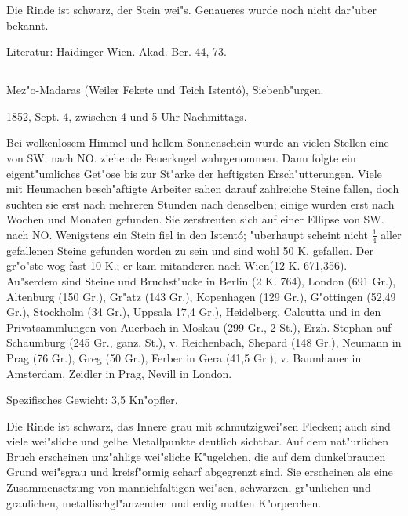 \documentclass[a4paper, 11pt, oneside]{article}
\begin{document}
Die Rinde ist schwarz, der Stein wei"s. Genaueres wurde noch nicht dar"uber bekannt.

\normalsize
Literatur: Haidinger Wien. Akad. Ber. 44, 73.

\subsection{}
\LARGE
\paragraph{}
Mez"o-Madaras (Weiler Fekete und Teich Istentó), Siebenb"urgen.

1852, Sept. 4, zwischen 4 und 5 Uhr Nachmittags.

Bei wolkenlosem Himmel und hellem Sonnenschein wurde an vielen Stellen eine von SW. nach NO. ziehende Feuerkugel wahrgenommen. Dann folgte ein eigent"umliches Get"ose bis zur St"arke der heftigsten Ersch"utterungen. Viele mit Heumachen besch"aftigte Arbeiter sahen darauf zahlreiche Steine fallen, doch suchten sie erst nach mehreren Stunden nach denselben; einige wurden erst nach Wochen und Monaten gefunden. Sie zerstreuten sich auf einer Ellipse von SW. nach NO. Wenigstens ein Stein fiel in den Istentó; "uberhaupt scheint nicht $\mathfrak{\frac{1}{4}}$ aller gefallenen Steine gefunden worden zu sein und sind wohl 50 K. gefallen. Der gr"o"ste wog fast 10 K.; er kam mitanderen nach Wien(12 K. 671,356). Au"serdem sind Steine und Bruchst"ucke in Berlin (2 K. 764), London (691 Gr.), Altenburg (150 Gr.), Gr"atz (143 Gr.), Kopenhagen (129 Gr.), G"ottingen (52,49 Gr.), Stockholm (34 Gr.), Uppsala 17,4 Gr.), Heidelberg, Calcutta und in den Privatsammlungen von Auerbach in Moskau (299 Gr., 2 St.), Erzh. Stephan auf Schaumburg (245 Gr., ganz. St.), v. Reichenbach, Shepard (148 Gr.), Neumann in Prag (76 Gr.), Greg (50 Gr.), Ferber in Gera (41,5 Gr.), v. Baumhauer in Amsterdam, Zeidler in Prag, Nevill in London.

Spezifisches Gewicht: 3,5 Kn"opfler.

Die Rinde ist schwarz, das Innere grau mit schmutzigwei"sen Flecken; auch sind viele wei"sliche und gelbe Metallpunkte deutlich sichtbar. Auf dem nat"urlichen Bruch erscheinen unz"ahlige wei"sliche K"ugelchen, die auf dem dunkelbraunen Grund wei"sgrau und kreisf"ormig scharf abgegrenzt sind. Sie erscheinen als eine Zusammensetzung von mannichfaltigen wei"sen, schwarzen, gr"unlichen und graulichen, metallischgl"anzenden und erdig matten K"orperchen.
\end{document}
